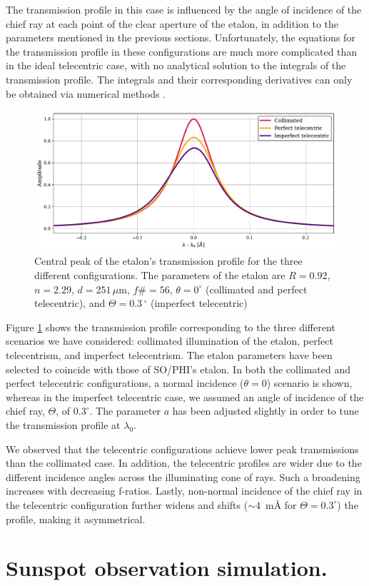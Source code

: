 The transmission profile in this case is influenced by the angle of incidence of the chief ray at each point of the clear aperture of the etalon, in addition to the parameters mentioned in the previous sections. Unfortunately, the equations for the transmission profile in these configurations are much more complicated than in the ideal telecentric case, with no analytical solution to the integrals of the transmission profile. The integrals and their corresponding derivatives can only be obtained via numerical methods \citep{franI}. 
\begin{figure}
    \centering
    \includegraphics[width = \textwidth]{figures/EtalonPaper/etalon_setups_profiles.pdf}
    \caption{Central peak of the etalon's transmission profile for the three different configurations. The parameters of the etalon are $R = 0.92$, $n = 2.29$, $d = 251 \, \mu \mathrm{m}$, $f\#=56$, $\theta = 0 ^{\circ}$ (collimated and perfect telecentric), and $\Theta = 0.3\,^{\circ}$ (imperfect telecentric)}
    \label{fig_etalon:Profiles-configs}
\end{figure}
Figure \ref{fig_etalon:Profiles-configs} shows the transmission profile corresponding to the three different scenarios we have considered: collimated illumination of the etalon, perfect telecentrism, and imperfect telecentrism. The etalon parameters have been selected to coincide with those of SO/PHI's etalon. In both the collimated and perfect telecentric configurations, a normal incidence  ($\theta = 0$) scenario is shown, whereas in the imperfect telecentric case, we assumed an angle of incidence of the chief ray, $\Theta$, of $0.3^{\circ}$. The parameter $a$ has been adjusted slightly in order to tune the transmission profile at $\lambda _ 0$.

We observed that the telecentric configurations achieve lower peak transmissions than the collimated case. In addition, the telecentric profiles are wider due to the different incidence angles across the illuminating cone of rays. Such a broadening increases with decreasing f-ratios. Lastly, non-normal incidence of the chief ray in the telecentric configuration further widens and shifts ($\sim 4$~m\r{A}
for $\Theta=0.3^\circ$) the profile, making it asymmetrical. 



\section{Sunspot observation simulation.}